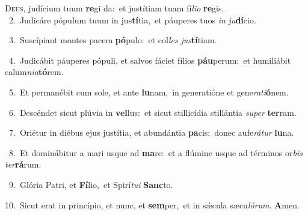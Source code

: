\lettrine{\initial\textcolor{\initialcolor}{D}}{eus,} judícium tuum \textbf{re}\-gi da:~\star et justítiam tuam fí\-\textit{li}\-\textit{o} \textbf{re}\-gis.\\
{\numbfont\textcolor{\numbcolor}{~2.}}~Judicáre pópulum tuum in jus\-\textbf{tí}\-tia,~\star et páuperes tuos \textit{in} \textit{ju}\-\textbf{dí}cio.\par
{\numbfont\textcolor{\numbcolor}{~3.}}~Suscípiant montes pacem \textbf{pó}\-pulo:~\star et col\textit{les} \textit{jus}\-\textbf{tí}tiam.\par
{\numbfont\textcolor{\numbcolor}{~4.}}~Judicábit páuperes pópuli, et salvos fáciet fílios \textbf{páu}\-perum:~\star et humiliábit calum\-\textit{ni}\-\textit{a}\textbf{tó}rem.\par
{\numbfont\textcolor{\numbcolor}{~5.}}~Et permanébit cum sole, et ante \textbf{lu}\-nam,~\star in generatióne et gene\-\textit{ra}\-\textit{ti}\textbf{ó}nem.\par
{\numbfont\textcolor{\numbcolor}{~6.}}~Descéndet sicut plúvia in \textbf{vel}\-lus:~\star et sicut stillicídia stillántia \textit{su}\-\textit{per} \textbf{ter}\-ram.\par
{\numbfont\textcolor{\numbcolor}{~7.}}~Oriétur in diébus ejus justítia, et abundántia \textbf{pa}\-cis:~\star donec aufe\-\textit{rá}\-\textit{tur} \textbf{lu}\-na.\par
{\numbfont\textcolor{\numbcolor}{~8.}}~Et dominábitur a mari usque ad \textbf{ma}\-re:~\star et a flúmine usque ad términos or\textit{bis} \textit{ter}\-\textbf{rá}rum.\par
{\numbfont\textcolor{\numbcolor}{~9.}}~Glória Patri, et \textbf{Fí}\-lio,~\star et Spirí\-\textit{tu}\-\textit{i} \textbf{Sanc}\-to.\par
{\numbfont\textcolor{\numbcolor}{10.}}~Sicut erat in princípio, et nunc, et \textbf{sem}\-per,~\star et in sǽcula sæcu\-\textit{ló}\-\textit{rum}. \textbf{A}\-men.\par
